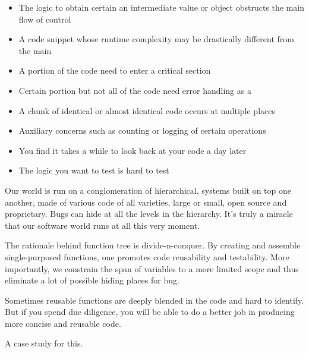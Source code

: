\begin{itemize}
    \item The logic to obtain certain an intermediate value or object obstructs the main flow of
    control
    \item A code snippet whose runtime complexity may be drastically different from the main
    \item A portion of the code need to enter a critical section
    \item Certain portion but not all of the code need error handling as a 
    \item A chunk of identical or almost identical code occurs at multiple places
    \item Auxiliary concerns such as counting or logging of certain operations
    \item You find it takes a while to look back at your code a day later
    \item The logic you want to test is hard to test
\end{itemize}

Our world is run on a conglomeration of hierarchical, systems built on top one another, made of
various code of all varieties, large or small, open source and proprietary.
Bugs can hide at all the levels in the hierarchy.
It's truly a miracle that our software world runs at all this very moment.


The rationale behind function tree is divide-n-conquer.
By creating and assemble single-purposed functions, one promotes code reusability and testability.
More importantly, we constrain the span of variables to a more limited scope and thus
eliminate a lot of possible hiding places for bug.


Sometimes reusable functions are deeply blended in the code and hard to identify.
But if you spend due diligence, you will be able to do a better job in producing more concise and
reusable code.

A case study for this.

\label{Evernote:Rotate array by k times}
\label{Evernote:Search for start and end of a target in a sorted array}

